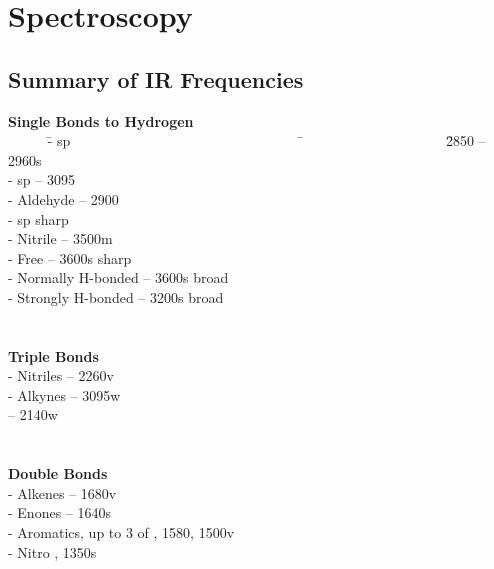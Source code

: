 \section{Spectroscopy}

\subsection{Summary of IR Frequencies}

\begin{tabbing}

\textbf{Single Bonds to Hydrogen} \\

  ~~~~~ \= - sp ~~~~~~~~~~~~~~~~~~~~~~~~~~~~~~~~ \=
     ~~~~~~~~~~~~~~~~~~~ \= 2850 -- 2960s \\
  \> - sp       \>              -- 3095 \\
  \> - Aldehyde          \>            -- 2900 \\
  \> - sp                \>              sharp \\
  \> - Nitrile           \>              -- 3500m \\
  \> - Free              \>              -- 3600s sharp \\
  \> - Normally H-bonded \>              -- 3600s broad \\
  \> - Strongly H-bonded \>              -- 3200s broad \\\\\\


\textbf{Triple Bonds} \\

  \> - Nitriles          \>              -- 2260v \\
  \> - Alkynes           \>        -- 3095w \\
  \>                     \>            -- 2140w \\\\\\


\textbf{Double Bonds} \\

  \> - Alkenes           \>              -- 1680v \\
  \> - Enones            \>          -- 1640s \\
  \> - Aromatics, up to 3 of \>                 , 1580, 1500v \\
  \> - Nitro             \>             , 1350s \\\\\\



\end{tabbing}
